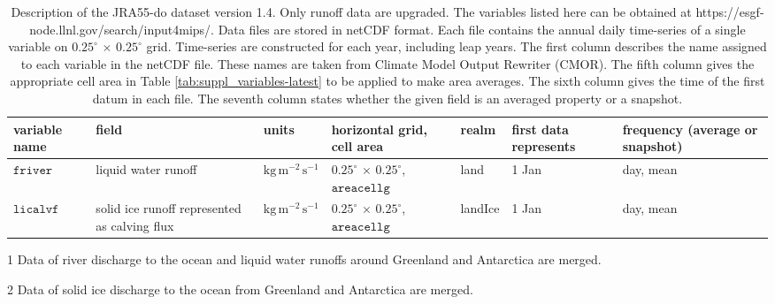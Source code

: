 \documentclass[dvipdfmx]{elsarticle_mod}
\begin{document}
\begin{table}[h]
\centering
\caption{Description of the JRA55-do dataset version 1.4. Only runoff data are upgraded. The variables listed here can be obtained at https://esgf-node.llnl.gov/search/input4mips/. Data files are stored in netCDF format. Each file contains the annual daily time-series of a single variable on $0.25^{\circ}\,\times\,0.25^{\circ}$ grid. Time-series are constructed for each year, including leap years. The first column describes the name assigned to each variable in the netCDF file. These names are taken from Climate Model Output Rewriter (CMOR). The fifth column gives the appropriate cell area in Table \ref{tab:suppl_variables-latest} to be applied to make area averages. The sixth column gives the time of the first datum in each file. The seventh column states whether the given field is an averaged property or a snapshot. \label{tab:main_variables_v1_4}}
\begin{threeparttable}
\begin{tabular*}{17.5cm}{p{1.4cm}|p{3.3cm}|p{1.6cm}|p{2.5cm}|p{1.8cm}|p{1.5cm}|p{2.8cm}}
\hline
variable name & field & units & horizontal grid, cell area & realm & first data represents & frequency (average or snapshot) \\ \hline \hline
$\texttt{friver}$ & liquid water runoff\tnote{1} & $\mathrm{kg}\,\mathrm{m}^{-2}\,\mathrm{s}^{-1}$ & $0.25^{\circ}\,\times\,0.25^{\circ}$, $\texttt{areacellg}$ & land & 1 Jan & day, mean \\ \hline
$\texttt{licalvf}$ & solid ice runoff represented as calving flux\tnote{2} & $\mathrm{kg}\,\mathrm{m}^{-2}\,\mathrm{s}^{-1}$ & $0.25^{\circ}\,\times\,0.25^{\circ}$, $\texttt{areacellg}$ & landIce & 1 Jan & day, mean \\ \hline
\end{tabular*}
\begin{tablenotes}
\item[1]{Data of river discharge to the ocean \citep{Suzuki_et_al_2018} and liquid water runoffs around Greenland \citep{Bamber_et_al_2018} and Antarctica \citep{Depoorter_et_al_2013} are merged.}
\item[2]{Data of solid ice discharge to the ocean from Greenland \citep{Bamber_et_al_2018} and Antarctica \citep{Depoorter_et_al_2013} are merged.} 
\end{tablenotes}
\end{threeparttable}
\end{table}
\end{document}

